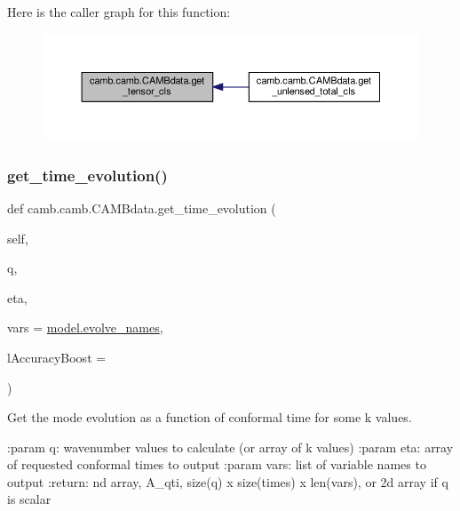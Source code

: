 Here is the caller graph for this function\+:
\nopagebreak
\begin{figure}[H]
\begin{center}
\leavevmode
\includegraphics[width=350pt]{classcamb_1_1camb_1_1CAMBdata_a3ae85ffc476cbae0733fee4ab2283cb9_icgraph}
\end{center}
\end{figure}
\mbox{\label{classcamb_1_1camb_1_1CAMBdata_ac826165c4abf9f9d2afd26a082345023}} 
\subsubsection{\texorpdfstring{get\+\_\+time\+\_\+evolution()}{get\_time\_evolution()}}
{\footnotesize\ttfamily def camb.\+camb.\+C\+A\+M\+Bdata.\+get\+\_\+time\+\_\+evolution (\begin{DoxyParamCaption}\item[{}]{self,  }\item[{}]{q,  }\item[{}]{eta,  }\item[{}]{vars = {\ttfamily \mbox{\hyperlink{namespacecamb_1_1model_a54f64726c80596131e388af10aa41cb6}{model.\+evolve\+\_\+names}}},  }\item[{}]{l\+Accuracy\+Boost = {} }\end{DoxyParamCaption})}

\begin{DoxyVerb}Get the mode evolution as a function of conformal time for some k values.

:param q: wavenumber values to calculate (or array of k values)
:param eta: array of requested conformal times to output
:param vars: list of variable names to output
:return: nd array, A_{qti}, size(q) x size(times) x len(vars), or 2d array if q is scalar
\end{DoxyVerb}
 

